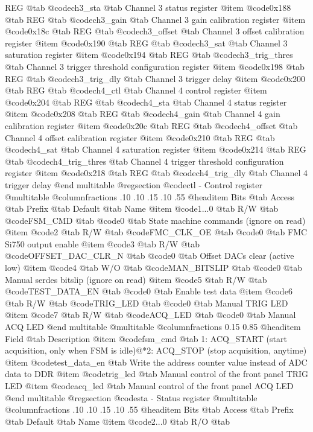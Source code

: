 REG @tab
@code{ch3_sta} @tab
Channel 3 status register
@item @code{0x188} @tab
REG @tab
@code{ch3_gain} @tab
Channel 3 gain calibration register
@item @code{0x18c} @tab
REG @tab
@code{ch3_offset} @tab
Channel 3 offset calibration register
@item @code{0x190} @tab
REG @tab
@code{ch3_sat} @tab
Channel 3 saturation register
@item @code{0x194} @tab
REG @tab
@code{ch3_trig_thres} @tab
Channel 3 trigger threshold configuration register
@item @code{0x198} @tab
REG @tab
@code{ch3_trig_dly} @tab
Channel 3 trigger delay
@item @code{0x200} @tab
REG @tab
@code{ch4_ctl} @tab
Channel 4 control register
@item @code{0x204} @tab
REG @tab
@code{ch4_sta} @tab
Channel 4 status register
@item @code{0x208} @tab
REG @tab
@code{ch4_gain} @tab
Channel 4 gain calibration register
@item @code{0x20c} @tab
REG @tab
@code{ch4_offset} @tab
Channel 4 offset calibration register
@item @code{0x210} @tab
REG @tab
@code{ch4_sat} @tab
Channel 4 saturation register
@item @code{0x214} @tab
REG @tab
@code{ch4_trig_thres} @tab
Channel 4 trigger threshold configuration register
@item @code{0x218} @tab
REG @tab
@code{ch4_trig_dly} @tab
Channel 4 trigger delay
@end multitable 
@regsection @code{ctl} - Control register
@multitable @columnfractions .10 .10 .15 .10 .55
@headitem Bits @tab Access @tab Prefix @tab Default @tab Name
@item @code{1...0}
@tab R/W @tab
@code{FSM_CMD}
@tab @code{0} @tab 
State machine commands (ignore on read)
@item @code{2}
@tab R/W @tab
@code{FMC_CLK_OE}
@tab @code{0} @tab 
FMC Si750 output enable
@item @code{3}
@tab R/W @tab
@code{OFFSET_DAC_CLR_N}
@tab @code{0} @tab 
Offset DACs clear (active low)
@item @code{4}
@tab W/O @tab
@code{MAN_BITSLIP}
@tab @code{0} @tab 
Manual serdes bitslip (ignore on read)
@item @code{5}
@tab R/W @tab
@code{TEST_DATA_EN}
@tab @code{0} @tab 
Enable test data
@item @code{6}
@tab R/W @tab
@code{TRIG_LED}
@tab @code{0} @tab 
Manual TRIG LED
@item @code{7}
@tab R/W @tab
@code{ACQ_LED}
@tab @code{0} @tab 
Manual ACQ LED
@end multitable
@multitable @columnfractions 0.15 0.85
@headitem Field @tab Description
@item @code{fsm_cmd} @tab 1: ACQ_START (start acquisition, only when FSM is idle)@*2: ACQ_STOP (stop acquisition, anytime)
@item @code{test_data_en} @tab Write the address counter value instead of ADC data to DDR
@item @code{trig_led} @tab Manual control of the front panel TRIG LED
@item @code{acq_led} @tab Manual control of the front panel ACQ LED
@end multitable
@regsection @code{sta} - Status register
@multitable @columnfractions .10 .10 .15 .10 .55
@headitem Bits @tab Access @tab Prefix @tab Default @tab Name
@item @code{2...0}
@tab R/O @tab
